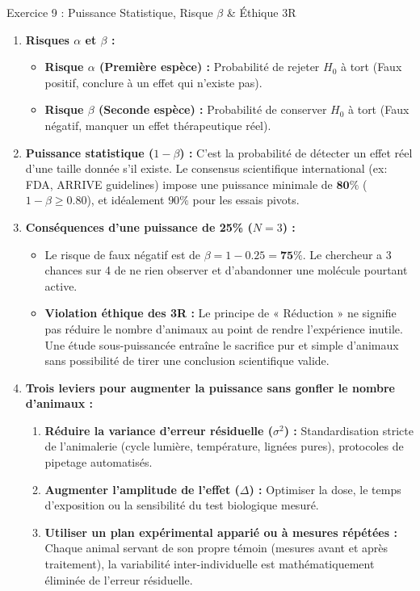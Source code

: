 \documentclass[11pt,a4paper]{article}
\begin{document}
\begin{solutionbox}{Exercice 9 : Puissance Statistique, Risque $\beta$ \& Éthique 3R}
\begin{enumerate}[label=\textbf{\alph*.}]
  \item \textbf{Risques $\alpha$ et $\beta$ :}
  \begin{itemize}
    \item \textbf{Risque $\alpha$ (Première espèce) :} Probabilité de rejeter $H_0$ à tort (Faux positif, conclure à un effet qui n'existe pas).
    \item \textbf{Risque $\beta$ (Seconde espèce) :} Probabilité de conserver $H_0$ à tort (Faux négatif, manquer un effet thérapeutique réel).
  \end{itemize}

  \item \textbf{Puissance statistique ($1 - \beta$) :}
  C'est la probabilité de détecter un effet réel d'une taille donnée s'il existe. Le consensus scientifique international (ex: FDA, ARRIVE guidelines) impose une puissance minimale de $\mathbf{80\%}$ ($1 - \beta \ge 0.80$), et idéalement $90\%$ pour les essais pivots.

  \item \textbf{Conséquences d'une puissance de 25\% ($N = 3$) :}
  \begin{itemize}
    \item Le risque de faux négatif est de $\beta = 1 - 0.25 = \mathbf{75\%}$. Le chercheur a 3 chances sur 4 de ne rien observer et d'abandonner une molécule pourtant active.
    \item \textbf{Violation éthique des 3R :} Le principe de « Réduction » ne signifie pas réduire le nombre d'animaux au point de rendre l'expérience inutile. Une étude sous-puissancée entraîne le sacrifice pur et simple d'animaux sans possibilité de tirer une conclusion scientifique valide.
  \end{itemize}

  \item \textbf{Trois leviers pour augmenter la puissance sans gonfler le nombre d'animaux :}
  \begin{enumerate}
    \item \textbf{Réduire la variance d'erreur résiduelle ($\sigma^2$) :} Standardisation stricte de l'animalerie (cycle lumière, température, lignées pures), protocoles de pipetage automatisés.
    \item \textbf{Augmenter l'amplitude de l'effet ($\Delta$) :} Optimiser la dose, le temps d'exposition ou la sensibilité du test biologique mesuré.
    \item \textbf{Utiliser un plan expérimental apparié ou à mesures répétées :} Chaque animal servant de son propre témoin (mesures avant et après traitement), la variabilité inter-individuelle est mathématiquement éliminée de l'erreur résiduelle.
  \end{enumerate}
\end{enumerate}
\end{solutionbox}
\end{document}
